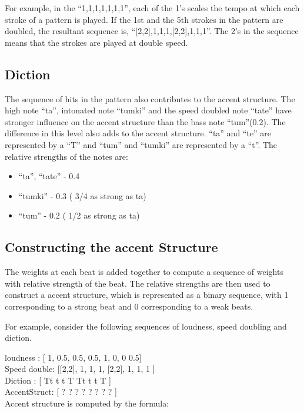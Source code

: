 For example, in the ``1,1,1,1,1,1,1'', each of the 1's scales the tempo at which each stroke of a pattern is played. 
If the 1st and the 5th strokes in the pattern are doubled, the resultant sequence is, ``[2,2],1,1,1,[2,2],1,1,1''. The 2's in the sequence means that the strokes are played at double speed.

\subsection{Diction}

The sequence of hits in the pattern also contributes to the accent structure. The high note ``ta'', intonated note ``tumki'' and the speed doubled note ``tate'' have stronger influence on the accent structure than the bass note ``tum''(0.2). The difference in this level also adds to the accent structure. ``ta'' and ``te'' are represented by a ``T'' and ``tum'' and ``tumki'' are represented by a ``t''. The relative strengths of the notes are:

\begin{itemize}
\item ``ta'', ``tate'' - 0.4
\item ``tumki'' - 0.3 ( 3/4 as strong as ta)
\item ``tum'' - 0.2 ( 1/2 as strong as ta)
\end{itemize}

\subsection{Constructing the accent Structure}

The weights at each beat is added together to compute a sequence of weights with relative strength of the beat. The relative strengths are then used to construct a accent structure, which is represented as a binary sequence, with 1 corresponding to a strong beat and 0 corresponding to a weak beats.

For example, consider the following sequences of loudness, speed doubling and diction.

loudness    : [  1,  0.5, 0.5, 0.5,  1,   0, 0 0.5] \\
Speed double: [[2,2], 1,   1,   1, [2,2], 1, 1, 1 ] \\
Diction     : [  Tt   t    t    T    Tt   t  t  T ] \\
AccentStruct: [  ?    ?    ?    ?    ?    ?  ?  ? ]  \\

Accent structure is computed by the formula:

